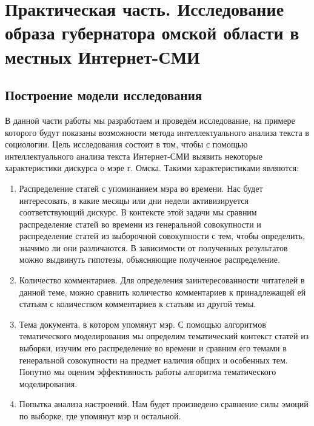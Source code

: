 \chapter{Практическая часть. Исследование образа губернатора омской области в местных Интернет-СМИ} \label{chapt2}
\section{Построение модели исследования} \label{sect2_1}
В данной части работы мы разработаем и проведём исследование, на примере которого будут показаны возможности метода интеллектуального анализа текста в социологии. Цель исследования состоит в том, чтобы с помощью интеллектуального анализа текста Интернет-СМИ выявить некоторые характеристики дискурса о мэре г. Омска. Такими характеристиками являются:
\begin{enumerate}
\item Распределение статей с упоминанием мэра во времени. Нас будет интересовать, в какие месяцы или дни недели активизируется соответствующий дискурс. В контексте этой задачи мы сравним распределение статей во времени из генеральной совокупности и распределение статей из выборочной совокупности с тем, чтобы определить, значимо ли они различаются. В зависимости от полученных результатов можно выдвинуть гипотезы, объясняющие полученное распределение.
\item Количество комментариев. Для определения заинтересованности читателей в данной теме, можно сравнить количество комментариев к принадлежащей ей статьям с количеством комментариев к статьям из другой темы.
\item Тема документа, в котором упомянут мэр. С помощью алгоритмов тематического моделирования мы определим тематический контекст статей из выборки, изучим его распределение во времени и сравним его темами в генеральной совокупности на предмет наличия общих и особенных тем. Попутно мы оценим эффективность работы алгоритма тематического моделирования. %
\item Попытка анализа настроений. Нам будет произведено сравнение силы эмоций по выборке, где упомянут мэр и остальной.
\end{enumerate}

